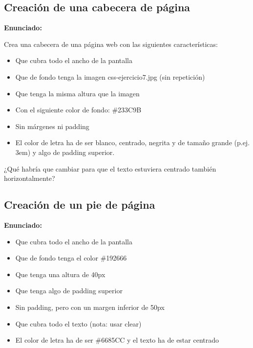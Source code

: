 \subsection{Creación de una cabecera de página}
\label{subsec:cabecera}

\textbf{Enunciado:}

Crea una cabecera de una página web con las siguientes características:

\begin{itemize}
  \item Que cubra todo el ancho de la pantalla
  \item Que de fondo tenga la imagen css-ejercicio7.jpg (sin repetición)
  \item Que tenga la misma altura que la imagen
  \item Con el siguiente color de fondo: \#233C9B
  \item Sin márgenes ni padding
  \item El color de letra ha de ser blanco, centrado, negrita y de tamaño grande (p.ej. 3em) y algo de padding superior.
\end{itemize}

¿Qué habría que cambiar para que el texto estuviera centrado también horizontalmente?

\subsection{Creación de un pie de página}
\label{subsec:pie}

\textbf{Enunciado:}

\begin{itemize}
  \item Que cubra todo el ancho de la pantalla
  \item Que de fondo tenga el color \#192666
  \item Que tenga una altura de 40px
  \item Que tenga algo de padding superior
  \item Sin padding, pero con un margen inferior de 50px
  \item Que cubra todo el texto (nota: usar clear) %
  \item El color de letra ha de ser \#6685CC y el texto ha de estar centrado
\end{itemize}

